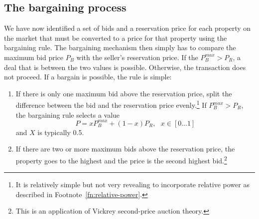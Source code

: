 \subsection{The bargaining process}
We have now identified  a set of bids and a reservation price for each property on the market that must be converted to a price for that property using the bargaining rule. 
The bargaining  mechanism then simply has to compare the maximum bid price $P_B$ with the seller's reservation price. If the $P_B^{max}>P_R$, a deal that is between the two values is possible. Otherwise, the transaction does not proceed.
If a bargain is possible, the rule is simple: 
\begin{enumerate}
    \item If there is only one maximum bid above the reservation price, split the difference between the bid and the reservation price evenly.\footnote{It is relatively simple but not very revealing to incorporate relative power as described in Footnote~\ref{fn:relative-power}.} If $P_B^{max}>P_R$,  the bargaining rule selects a value 
    \[P = xP_B^{max}+(1-x)P_R, \ \ \ x\in [0\dots 1] \]
and $X$ is typically 0.5.
    \item If there are two or more maximum bids above the reservation price, the property goes to the highest  and the price is the second highest bid.\footnote{This is an application of Vickrey \gls{second-price auction} theory\cite{levinAuctionTheory2004}.} 

\end{enumerate}
  




